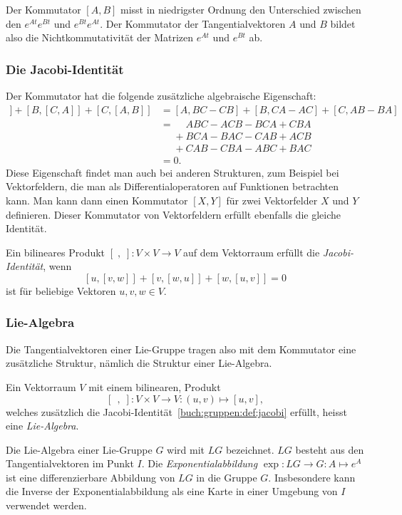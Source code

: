 Der Kommutator $[A,B]$ misst in niedrigster Ordnung den Unterschied
zwischen den
$ e^{At} e^{Bt} $
und
$ e^{Bt} e^{At} $.
Der Kommutator der Tangentialvektoren $A$ und $B$ bildet also die
Nichtkommutativität der Matrizen $e^{At}$ und $e^{Bt}$ ab.

\subsubsection{Die Jacobi-Identität}
Der Kommutator hat die folgende zusätzliche algebraische Eigenschaft:
\begin{align*}
[A,[B,C]]
+
[B,[C,A]]
+
[C,[A,B]]
&=
[A,BC-CB]
+
[B,CA-AC]
+
[C,AB-BA]
\\
&=\phantom{+}
ABC-ACB-BCA+CBA
\\
&\phantom{=}+
BCA-BAC-CAB+ACB
\\
&\phantom{=}+
CAB-CBA-ABC+BAC
\\
&=0.
\end{align*}
Diese Eigenschaft findet man auch bei anderen Strukturen, zum Beispiel
bei Vektorfeldern, die man als Differentialoperatoren auf Funktionen 
betrachten kann.
Man kann dann einen Kommutator $[X,Y]$ für zwei Vektorfelder
$X$ und $Y$ definieren.
Dieser Kommutator von Vektorfeldern erfüllt ebenfalls die gleiche
Identität.

\begin{definition}
\label{buch:gruppen:def:jacobi}
Ein bilineares Produkt $[\;,\;]\colon V\times V\to V$ auf dem Vektorraum
erfüllt die {\em Jacobi-Identität}, wenn 
%
\[
[u,[v,w]] + [v,[w,u]] + [w,[u,v]]=0
\]
ist für beliebige Vektoren $u,v,w\in V$.
\end{definition}

\subsubsection{Lie-Algebra}
Die Tangentialvektoren einer Lie-Gruppe tragen also mit dem Kommutator
eine zusätzliche Struktur, nämlich die Struktur einer Lie-Algebra.

\begin{definition}
Ein Vektorraum $V$ mit einem bilinearen, Produkt
\[
[\;\,,\;]\colon V\times V \to V : (u,v) \mapsto [u,v],
\]
welches zusätzlich die Jacobi-Identität~\ref{buch:gruppen:def:jacobi}
erfüllt, heisst eine {\em Lie-Algebra}.
%
\end{definition}

Die Lie-Algebra einer Lie-Gruppe $G$ wird mit $LG$ bezeichnet.
$LG$ besteht aus den Tangentialvektoren im Punkt $I$.
Die {\em Exponentialabbildung} $\exp\colon LG\to G:A\mapsto e^A$
%
ist eine differenzierbare Abbildung von $LG$ in die Gruppe $G$.
Insbesondere kann die Inverse der Exponentialabbildung als eine
Karte in einer Umgebung von $I$ verwendet werden.

